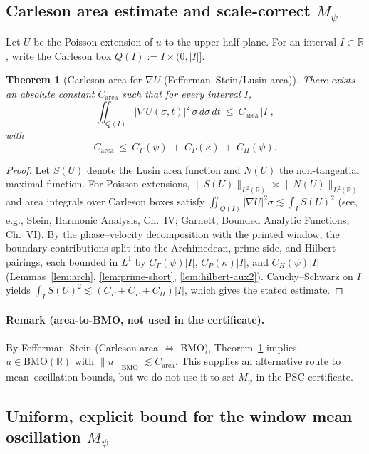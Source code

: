 \documentclass[11pt]{article}
\newtheorem{theorem}{Theorem}
\theoremstyle{definition}
\theoremstyle{remark}
\newcommand{\R}{\mathbb{R}}
\begin{document}
\subsection*{Carleson area estimate and scale-correct $M_\psi$}
Let $U$ be the Poisson extension of $u$ to the upper half-plane. For an interval $I\subset\R$, write the Carleson box $Q(I):=I\times(0,|I|]$.

\begin{theorem}[Carleson area for $\nabla U$ (Fefferman--Stein/Lusin area)]\label{thm:carleson-area}
There exists an absolute constant $C_{\mathrm{area}}$ such that for every interval $I$,
\[
  \iint_{Q(I)} |\nabla U(\sigma,t)|^2\,\sigma\,d\sigma\,dt\ \le\ C_{\mathrm{area}}\,|I|,
\]
with
\[
  C_{\mathrm{area}}\ \le\ C_\Gamma(\psi)\ +\ C_P(\kappa)\ +\ C_H(\psi).
\]
\end{theorem}
\begin{proof}
Let $S(U)$ denote the Lusin area function and $N(U)$ the non-tangential maximal function. For Poisson extensions, $\|S(U)\|_{L^2(\R)}\asymp\|N(U)\|_{L^2(\R)}$ and area integrals over Carleson boxes satisfy $\iint_{Q(I)}|\nabla U|^2\sigma\lesssim \int_I S(U)^2$ (see, e.g., Stein, Harmonic Analysis, Ch.~IV; Garnett, Bounded Analytic Functions, Ch.~VI). By the phase–velocity decomposition with the printed window, the boundary contributions split into the Archimedean, prime-side, and Hilbert pairings, each bounded in $L^1$ by $C_\Gamma(\psi)|I|$, $C_P(\kappa)|I|$, and $C_H(\psi)|I|$ (Lemmas~\ref{lem:arch}, \ref{lem:prime-short}, \ref{lem:hilbert-aux2}). Cauchy–Schwarz on $I$ yields $\int_I S(U)^2\lesssim (C_\Gamma+C_P+C_H)|I|$, which gives the stated estimate.
\end{proof}

\paragraph{Remark (area-to-BMO, not used in the certificate).}\label{rem:Mpsi-scale}
By Fefferman–Stein (Carleson area $\Leftrightarrow$ BMO), Theorem~\ref{thm:carleson-area} implies $u\in\mathrm{BMO}(\R)$ with $\|u\|_{\mathrm{BMO}}\lesssim C_{\mathrm{area}}$. This supplies an alternative route to mean–oscillation bounds, but we do not use it to set $M_\psi$ in the PSC certificate.

\subsection*{Uniform, explicit bound for the window mean–oscillation $M_\psi$}
\end{document}
